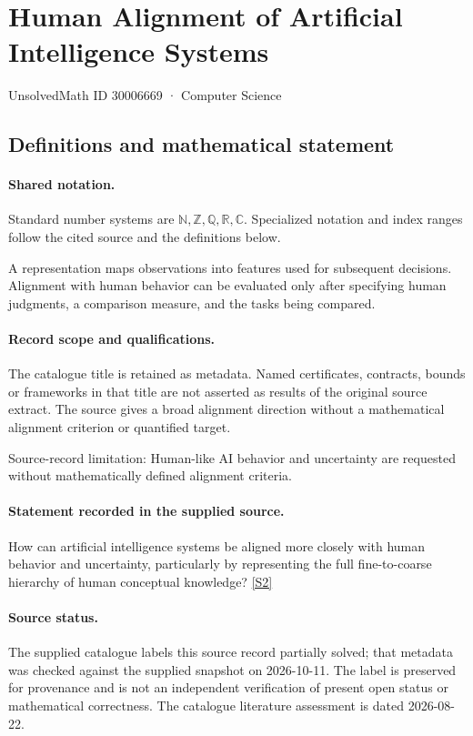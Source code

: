 \documentclass[11pt]{article}
\newcommand{\sref}[2]{\hyperlink{source:#1:#2}{[S#2]}}
\begin{document}
\setcounter{section}{30006668}
\section{Human Alignment of Artificial Intelligence Systems}\label{30006669}
{\small\sffamily UnsolvedMath ID 30006669 · Computer Science}
\subsection{Definitions and mathematical statement}

\paragraph{Shared notation.}Standard number systems are $\mathbb N,\mathbb Z,\mathbb Q,\mathbb R,\mathbb C$. Specialized notation and index ranges follow the cited source and the definitions below.


A representation maps observations into features used for subsequent decisions. Alignment with human behavior can be evaluated only after specifying human judgments, a comparison measure, and the tasks being compared.
\paragraph{Record scope and qualifications.}
The catalogue title is retained as metadata. Named certificates, contracts, bounds or frameworks in that title are not asserted as results of the original source extract.
The source gives a broad alignment direction without a mathematical alignment criterion or quantified target.

Source-record limitation: Human-like AI behavior and uncertainty are requested without mathematically defined alignment criteria.
\paragraph{Statement recorded in the supplied source.}
How can artificial intelligence systems be aligned more closely with human behavior and uncertainty, particularly by representing the full fine-to-coarse hierarchy of human conceptual knowledge? \sref{30006669}{2}
\paragraph{Source status.}
The supplied catalogue labels this source record partially solved; that metadata was checked against the supplied snapshot on 2026-10-11. The label is preserved for provenance and is not an independent verification of present open status or mathematical correctness. The catalogue literature assessment is dated 2026-08-22.
\end{document}
